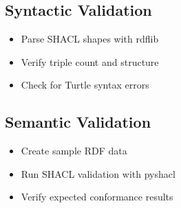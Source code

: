 \subsection{Syntactic Validation}

\begin{itemize}
    \item Parse SHACL shapes with rdflib
    \item Verify triple count and structure
    \item Check for Turtle syntax errors
\end{itemize}

\subsection{Semantic Validation}

\begin{itemize}
    \item Create sample RDF data
    \item Run SHACL validation with pyshacl
    \item Verify expected conformance results
\end{itemize}
